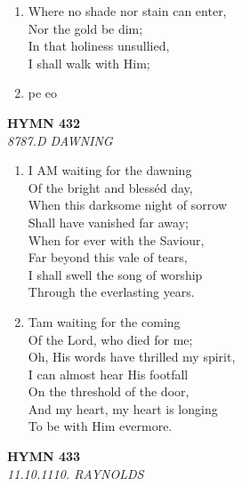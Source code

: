 \documentclass[11pt,a4paper]{article}
\begin{document}
\begin{enumerate}
    \item Where no shade nor stain can enter, \\
        Nor the gold be dim; \\
        In that holiness unsullied, \\
        I shall walk with Him;

    \item pe eo

\end{enumerate}

\newpage
\begin{center}
    {\Large \textbf{HYMN 432}}
    \\
    \textit{8787.D DAWNING}
\end{center}
\vspace{1em}

\begin{enumerate}
    \item I AM waiting for the dawning \\
        Of the bright and blesséd day, \\
        When this darksome night of sorrow \\
        Shall have vanished far away; \\
        When for ever with the Saviour, \\
        Far beyond this vale of tears, \\
        I shall swell the song of worship \\
        Through the everlasting years.

    \item Tam waiting for the coming \\
        Of the Lord, who died for me; \\
        Oh, His words have thrilled my spirit, \\
        I can almost hear His footfall \\
        On the threshold of the door, \\
        And my heart, my heart is longing \\
        To be with Him evermore.

\end{enumerate}

\newpage
\begin{center}
    {\Large \textbf{HYMN 433}}
    \\
    \textit{11.10.1110. RAYNOLDS}
\end{center}
\vspace{1em}
\end{document}
